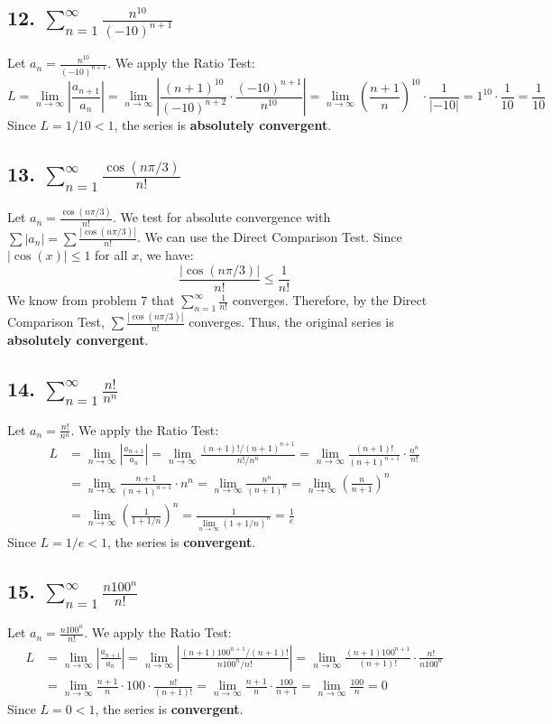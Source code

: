 \documentclass{article}
\begin{document}
\subsection*{12. $\sum_{n=1}^{\infty} \frac{n^{10}}{(-10)^{n+1}}$}
Let $a_n = \frac{n^{10}}{(-10)^{n+1}}$. We apply the Ratio Test:
\[ L = \lim_{n \to \infty} \left| \frac{a_{n+1}}{a_n} \right| = \lim_{n \to \infty} \left| \frac{(n+1)^{10}}{(-10)^{n+2}} \cdot \frac{(-10)^{n+1}}{n^{10}} \right| = \lim_{n \to \infty} \left(\frac{n+1}{n}\right)^{10} \cdot \frac{1}{|-10|} = 1^{10} \cdot \frac{1}{10} = \frac{1}{10} \]
Since $L = 1/10 < 1$, the series is \textbf{absolutely convergent}.

\subsection*{13. $\sum_{n=1}^{\infty} \frac{\cos(n\pi/3)}{n!}$}
Let $a_n = \frac{\cos(n\pi/3)}{n!}$. We test for absolute convergence with $\sum |a_n| = \sum \frac{|\cos(n\pi/3)|}{n!}$.
We can use the Direct Comparison Test. Since $|\cos(x)| \le 1$ for all $x$, we have:
\[ \frac{|\cos(n\pi/3)|}{n!} \le \frac{1}{n!} \]
We know from problem 7 that $\sum_{n=1}^{\infty} \frac{1}{n!}$ converges. Therefore, by the Direct Comparison Test, $\sum \frac{|\cos(n\pi/3)|}{n!}$ converges.
Thus, the original series is \textbf{absolutely convergent}.

\subsection*{14. $\sum_{n=1}^{\infty} \frac{n!}{n^n}$}
Let $a_n = \frac{n!}{n^n}$. We apply the Ratio Test:
\begin{align*}
L &= \lim_{n \to \infty} \left| \frac{a_{n+1}}{a_n} \right| = \lim_{n \to \infty} \frac{(n+1)!/(n+1)^{n+1}}{n!/n^n} = \lim_{n \to \infty} \frac{(n+1)!}{(n+1)^{n+1}} \cdot \frac{n^n}{n!} \\
&= \lim_{n \to \infty} \frac{n+1}{(n+1)^{n+1}} \cdot n^n = \lim_{n \to \infty} \frac{n^n}{(n+1)^n} = \lim_{n \to \infty} \left(\frac{n}{n+1}\right)^n \\
&= \lim_{n \to \infty} \left(\frac{1}{1+1/n}\right)^n = \frac{1}{\lim_{n \to \infty}(1+1/n)^n} = \frac{1}{e}
\end{align*}
Since $L = 1/e < 1$, the series is \textbf{convergent}.

\subsection*{15. $\sum_{n=1}^{\infty} \frac{n100^n}{n!}$}
Let $a_n = \frac{n100^n}{n!}$. We apply the Ratio Test:
\begin{align*}
L &= \lim_{n \to \infty} \left| \frac{a_{n+1}}{a_n} \right| = \lim_{n \to \infty} \left| \frac{(n+1)100^{n+1}/(n+1)!}{n100^n/n!} \right| = \lim_{n \to \infty} \frac{(n+1)100^{n+1}}{(n+1)!} \cdot \frac{n!}{n100^n} \\
&= \lim_{n \to \infty} \frac{n+1}{n} \cdot 100 \cdot \frac{n!}{(n+1)!} = \lim_{n \to \infty} \frac{n+1}{n} \cdot \frac{100}{n+1} = \lim_{n \to \infty} \frac{100}{n} = 0
\end{align*}
Since $L = 0 < 1$, the series is \textbf{convergent}.
\end{document}
